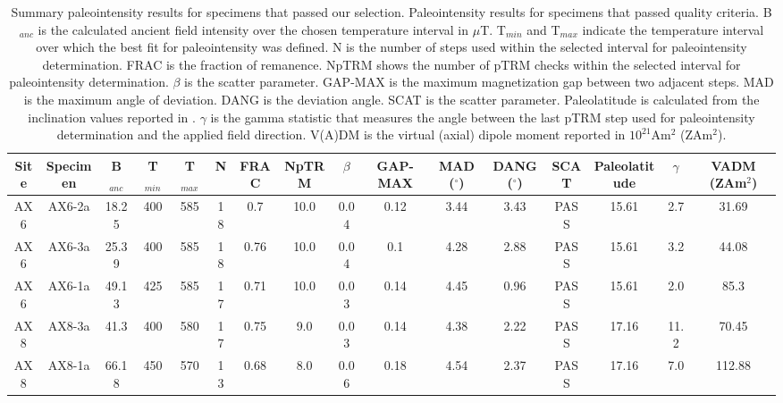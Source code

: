 \documentclass[9pt,twocolumn,twoside,lineno]{pnas-new}
\begin{document}
\begin{table}
\caption{\footnotesize{Summary paleointensity results for specimens that passed our selection. Paleointensity results for specimens that passed quality criteria. B$_{anc}$ is the calculated ancient field intensity over the chosen temperature interval in $\mu$T. T$_{min}$ and T$_{max}$ indicate the temperature interval over which the best fit for paleointensity was defined. N is the number of steps used within the selected interval for paleointensity determination. FRAC is the fraction of remanence. NpTRM shows the number of pTRM checks within the selected interval for paleointensity determination. $\beta$ is the scatter parameter.  GAP-MAX is the maximum magnetization gap between two adjacent steps. MAD is the maximum angle of deviation. DANG is the deviation angle. SCAT is the scatter parameter. Paleolatitude is calculated from the inclination values reported in . $\gamma$ is the gamma statistic that measures the angle between the last pTRM step used for paleointensity determination and the applied field direction. V(A)DM is the virtual (axial) dipole moment reported in $10^{21}$Am$^2$ (ZAm$^2$). }}
\centering
\begin{tabular}{cccccccccccccccc}
\hline
Site & Specimen & B$_{anc}$ & T$_{min}$ & T$_{max}$ & N    & FRAC & NpTRM & $\beta$ & GAP-MAX & MAD ($^\circ$) & DANG ($^\circ$) & SCAT & Paleolatitude & $\gamma$ & VADM (ZAm$^2$) \\
\hline
AX6  & AX6-2a   & 18.25     & 400       & 585       & 18 & 0.7  & 10.0  & 0.04    & 0.12    & 3.44           & 3.43            & PASS & 15.61         & 2.7      & 31.69          \\
AX6  & AX6-3a   & 25.39     & 400       & 585       & 18 & 0.76 & 10.0  & 0.04    & 0.1     & 4.28           & 2.88            & PASS & 15.61         & 3.2      & 44.08          \\
AX6  & AX6-1a   & 49.13     & 425       & 585       & 17 & 0.71 & 10.0  & 0.03    & 0.14    & 4.45           & 0.96            & PASS & 15.61         & 2.0      & 85.3           \\
AX8  & AX8-3a   & 41.3      & 400       & 580       & 17 & 0.75 & 9.0   & 0.03    & 0.14    & 4.38           & 2.22            & PASS & 17.16         & 11.2     & 70.45          \\
AX8  & AX8-1a   & 66.18     & 450       & 570       & 13 & 0.68 & 8.0   & 0.06    & 0.18    & 4.54           & 2.37            & PASS & 17.16         & 7.0      & 112.88         \\

\end{tabular}
\end{table}
\end{document}
